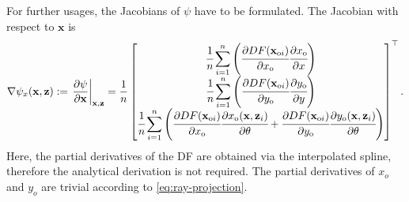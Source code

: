 For further usages, the Jacobians of $\psi$ have to be formulated.
The Jacobian with respect to $\mathbf{x}$ is
\begin{equation}\label{eq:measmodel-jacobi-x}
    \nabla\psi_x(\mathbf{x},\mathbf{z}) := \left.\frac{\partial\psi}{\partial \mathbf{x}}\right\vert_{\mathbf{x},\mathbf{z}} =
    \frac{1}{n}
    \begin{bmatrix}
        \cfrac{1}{n}\displaystyle\sum\limits_{i=1}^{n}\left(\cfrac{\partial DF(\mathbf{x}_{\text{o}i})}{\partial x_{\text{o}}}\cfrac{\partial x_{\text{o}}}{\partial x}\right) \\
        \cfrac{1}{n}\displaystyle\sum\limits_{i=1}^{n}\left(\cfrac{\partial DF(\mathbf{x}_{\text{o}i})}{\partial y_{\text{o}}}\cfrac{\partial y_{\text{o}}}{\partial y}\right) \\
        \cfrac{1}{n}\displaystyle\sum\limits_{i=1}^{n}\left(\cfrac{\partial DF(\mathbf{x}_{\text{o}i})}{\partial x_{\text{o}}}\cfrac{\partial x_{\text{o}}(\mathbf{x},\mathbf{z}_i)}{\partial \theta}
        + \cfrac{\partial DF(\mathbf{x}_{\text{o}i})}{\partial y_{\text{o}}}\cfrac{\partial y_{\text{o}}(\mathbf{x},\mathbf{z}_i)}{\partial \theta}\right)                     \\
    \end{bmatrix}^{\top}.
\end{equation}
Here, the partial derivatives of the DF are obtained via the interpolated spline, therefore the analytical
derivation is not required.
The partial derivatives of $x_o$ and $y_o$ are trivial according to \eqref{eq:ray-projection}.

